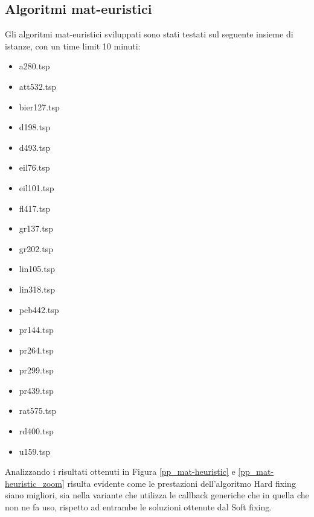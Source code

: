 \vspace{2cm}
\subsection{Algoritmi mat-euristici}
Gli algoritmi mat-euristici sviluppati sono stati testati sul seguente insieme di istanze, con un time limit 10 minuti:
\begin{center}
\begin{multicols}{3}
\begin{itemize}
\item{a280.tsp}  
\item{att532.tsp} 
\item{bier127.tsp}
\item{d198.tsp}   
\item{d493.tsp}   
\item{eil76.tsp}  
\item{eil101.tsp} 
\item{fl417.tsp}  
\item{gr137.tsp}  
\item{gr202.tsp}  
\item{lin105.tsp} 
\item{lin318.tsp} 
\item{pcb442.tsp} 
\item{pr144.tsp}  
\item{pr264.tsp}  
\item{pr299.tsp}  
\item{pr439.tsp}  
\item{rat575.tsp} 
\item{rd400.tsp}  
\item{u159.tsp}
\end{itemize}
\end{multicols}
\end{center}
Analizzando i risultati ottenuti in Figura \ref{pp_mat-heuristic} e \ref{pp_mat-heuristic_zoom} risulta evidente come le prestazioni dell'algoritmo Hard fixing siano migliori, sia nella variante che utilizza le callback generiche che in quella che non ne fa uso, rispetto ad entrambe le soluzioni ottenute dal Soft fixing.
